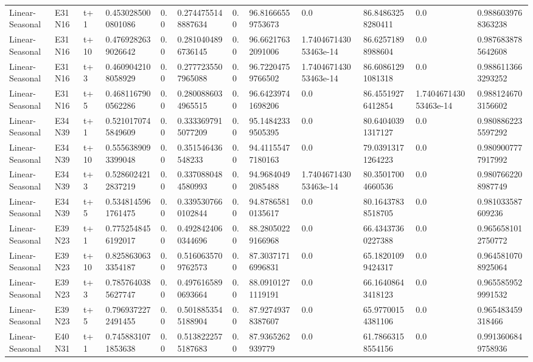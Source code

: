 \begin{landscape}
\begin{longtable}{llllllllllll}
Linear-Seasonal & E31N16 & t+1 & 0.4530285000801086 & 0.0 & 0.2744755148887634 & 0.0 & 96.81666559753673 & 0.0 & 86.84863258280411 & 0.0 & 0.9886039768363238 \\
Linear-Seasonal & E31N16 & t+10 & 0.4769282639026642 & 0.0 & 0.2810404896736145 & 0.0 & 96.66217632091006 & 1.740467143053463e-14 & 86.62571898988604 & 0.0 & 0.9876838785642608 \\
Linear-Seasonal & E31N16 & t+3 & 0.4609042108058929 & 0.0 & 0.2777235507965088 & 0.0 & 96.72204759766502 & 1.740467143053463e-14 & 86.60861291081318 & 0.0 & 0.9886113663293252 \\
Linear-Seasonal & E31N16 & t+5 & 0.4681167900562286 & 0.0 & 0.2800886034965515 & 0.0 & 96.64239741698206 & 0.0 & 86.45519276412854 & 1.740467143053463e-14 & 0.9881246703156602 \\
Linear-Seasonal & E34N39 & t+1 & 0.5210170745849609 & 0.0 & 0.3333697915077209 & 0.0 & 95.14842339505395 & 0.0 & 80.64040391317127 & 0.0 & 0.9808862235597292 \\
Linear-Seasonal & E34N39 & t+10 & 0.5556389093399048 & 0.0 & 0.351546436548233 & 0.0 & 94.41155477180163 & 0.0 & 79.03913171264223 & 0.0 & 0.9809007777917992 \\
Linear-Seasonal & E34N39 & t+3 & 0.5286024212837219 & 0.0 & 0.3370880484580993 & 0.0 & 94.96840492085488 & 1.740467143053463e-14 & 80.35017004660536 & 0.0 & 0.9807662208987749 \\
Linear-Seasonal & E34N39 & t+5 & 0.5348145961761475 & 0.0 & 0.3395307660102844 & 0.0 & 94.87865810135617 & 0.0 & 80.16437838518705 & 0.0 & 0.981033587609236 \\
Linear-Seasonal & E39N23 & t+1 & 0.7752548456192017 & 0.0 & 0.4928424060344696 & 0.0 & 88.28050229166968 & 0.0 & 66.43437360227388 & 0.0 & 0.9656581012750772 \\
Linear-Seasonal & E39N23 & t+10 & 0.8258630633354187 & 0.0 & 0.5160635709762573 & 0.0 & 87.30371716996831 & 0.0 & 65.18201099424317 & 0.0 & 0.9645810708925064 \\
Linear-Seasonal & E39N23 & t+3 & 0.7857640385627747 & 0.0 & 0.4976165890693664 & 0.0 & 88.09101271119191 & 0.0 & 66.16408643418123 & 0.0 & 0.9655859529991532 \\
Linear-Seasonal & E39N23 & t+5 & 0.7969372272491455 & 0.0 & 0.5018853545188904 & 0.0 & 87.92749378387607 & 0.0 & 65.97700154381106 & 0.0 & 0.965483459318466 \\
Linear-Seasonal & E40N31 & t+1 & 0.7458831071853638 & 0.0 & 0.5138222575187683 & 0.0 & 87.9365262939779 & 0.0 & 61.78663158554156 & 0.0 & 0.9913606849758936 \\

\end{longtable}
\end{landscape}
